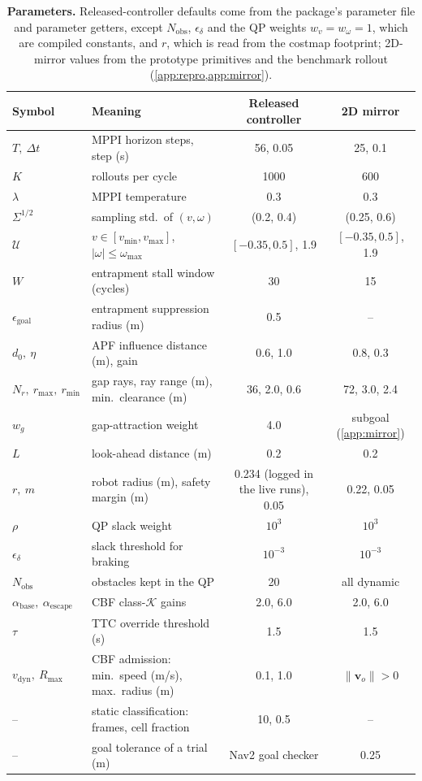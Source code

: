 \begin{table}[!htbp]
\centering
\caption{\textbf{Parameters.} Released-controller defaults come from the package's parameter file and parameter getters, except $N_{\mathrm{obs}}$, $\epsilon_\delta$ and the QP weights $w_v=w_\omega=1$, which are compiled constants, and $r$, which is read from the costmap footprint; 2D-mirror values from the prototype primitives and the benchmark rollout (\cref{app:repro,app:mirror}).}
\label{tab:params}
\footnotesize
\setlength{\tabcolsep}{4pt}
\begin{tabular}{llcc}
\toprule
Symbol & Meaning & Released controller & 2D mirror \\
\midrule
$T,\ \Delta t$ & MPPI horizon steps, step (s) & 56, 0.05 & 25, 0.1 \\
$K$ & rollouts per cycle & 1000 & 600 \\
$\lambda$ & MPPI temperature & 0.3 & 0.3 \\
$\Sigma^{1/2}$ & sampling std.\ of $(v,\omega)$ & (0.2, 0.4) & (0.25, 0.6) \\
$\mathcal{U}$ & $v\in[v_{\min},v_{\max}]$, $|\omega|\le\omega_{\max}$ & $[-0.35, 0.5]$, 1.9 & $[-0.35, 0.5]$, 1.9 \\
$W$ & entrapment stall window (cycles) & 30 & 15 \\
$\epsilon_{\mathrm{goal}}$ & entrapment suppression radius (m) & 0.5 & -- \\
$d_0,\ \eta$ & APF influence distance (m), gain & 0.6, 1.0 & 0.8, 0.3 \\
$N_r,\ r_{\max},\ r_{\min}$ & gap rays, ray range (m), min.\ clearance (m) & 36, 2.0, 0.6 & 72, 3.0, 2.4 \\
$w_g$ & gap-attraction weight & 4.0 & subgoal (\cref{app:mirror}) \\
$L$ & look-ahead distance (m) & 0.2 & 0.2 \\
$r,\ m$ & robot radius (m), safety margin (m) & 0.234 (logged in the live runs), 0.05 & 0.22, 0.05 \\
$\rho$ & QP slack weight & $10^{3}$ & $10^{3}$ \\
$\epsilon_\delta$ & slack threshold for braking & $10^{-3}$ & $10^{-3}$ \\
$N_{\mathrm{obs}}$ & obstacles kept in the QP & 20 & all dynamic \\
$\alpha_{\mathrm{base}},\ \alpha_{\mathrm{escape}}$ & CBF class-$\mathcal{K}$ gains & 2.0, 6.0 & 2.0, 6.0 \\
$\tau$ & TTC override threshold (s) & 1.5 & 1.5 \\
$v_{\mathrm{dyn}},\ R_{\max}$ & CBF admission: min.\ speed (m/s), max.\ radius (m) & 0.1, 1.0 & $\|\mathbf{v}_o\|>0$ \\
-- & static classification: frames, cell fraction & 10, 0.5 & -- \\
-- & goal tolerance of a trial (m) & Nav2 goal checker & 0.25 \\
\bottomrule
\end{tabular}
\end{table}

